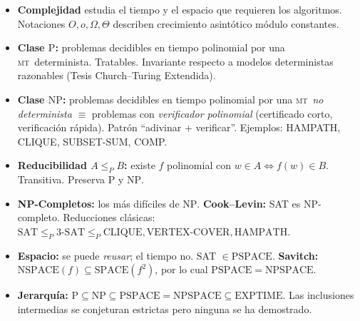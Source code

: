 \documentclass[11pt,a4paper]{article}
\theoremstyle{definicion}
\newcommand{\MT}{\textsc{mt}}
\newcommand{\redP}{\leq_{P}}
\newcommand{\NP}{\mathrm{NP}}
\newcommand{\Pclass}{\mathrm{P}}
\newcommand{\SPACE}{\mathrm{SPACE}}
\newcommand{\NSPACE}{\mathrm{NSPACE}}
\newcommand{\PSPACE}{\mathrm{PSPACE}}
\newcommand{\NPSPACE}{\mathrm{NPSPACE}}
\newcommand{\EXPTIME}{\mathrm{EXPTIME}}
\begin{document}
\begin{itemize}
    \item \textbf{Complejidad} estudia el tiempo y el espacio que requieren los algoritmos. Notaciones $O, o, \Omega, \Theta$ describen crecimiento asint\'otico m\'odulo constantes.
    \item \textbf{Clase $\Pclass$:} problemas decidibles en tiempo polinomial por una \MT\ determinista. Tratables. Invariante respecto a modelos deterministas razonables (Tesis Church--Turing Extendida).
    \item \textbf{Clase $\NP$:} problemas decidibles en tiempo polinomial por una \MT\ \emph{no determinista} $\equiv$ problemas con \emph{verificador polinomial} (certificado corto, verificaci\'on r\'apida). Patr\'on ``adivinar + verificar''. Ejemplos: HAMPATH, CLIQUE, SUBSET-SUM, COMP.
    \item \textbf{Reducibilidad $A \redP B$:} existe $f$ polinomial con $w \in A \iff f(w) \in B$. Transitiva. Preserva $\Pclass$ y $\NP$.
    \item \textbf{NP-Completos:} los m\'as dif\'iciles de $\NP$. \textbf{Cook--Levin:} SAT es NP-completo. Reducciones cl\'asicas: $\mathrm{SAT} \redP \mathrm{3\text{-}SAT} \redP \mathrm{CLIQUE}, \mathrm{VERTEX\text{-}COVER}, \mathrm{HAMPATH}$.
    \item \textbf{Espacio:} se puede \emph{reusar}; el tiempo no. SAT $\in \PSPACE$. \textbf{Savitch:} $\NSPACE(f) \subseteq \SPACE(f^2)$, por lo cual $\PSPACE = \NPSPACE$.
    \item \textbf{Jerarqu\'ia:} $\Pclass \subseteq \NP \subseteq \PSPACE = \NPSPACE \subseteq \EXPTIME$. Las inclusiones intermedias se conjeturan estrictas pero ninguna se ha demostrado.
\end{itemize}
\end{document}
